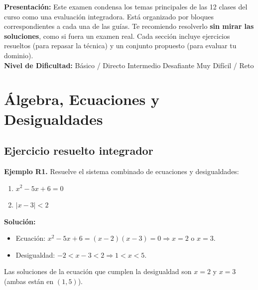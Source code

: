 \documentclass[12pt, a4paper]{article}
\begin{document}


\vspace{4pt}
\begin{cuadroinfo}
  \small
  \textbf{Presentación:} Este examen condensa los temas principales de las 12 clases del curso como una evaluación integradora. Está organizado por bloques correspondientes a cada una de las guías. Te recomiendo resolverlo \textbf{sin mirar las soluciones}, como si fuera un examen real. Cada sección incluye ejercicios resueltos (para repasar la técnica) y un conjunto propuesto (para evaluar tu dominio).
  \\[4pt]
  \textbf{Nivel de Dificultad:}\quad
  \facil{} Básico / Directo \quad
  \medio{} Intermedio \quad
  \dificil{} Desafiante \quad
  \muyDificil{} Muy Difícil / Reto
\end{cuadroinfo}

\vspace{8pt}

\section{Álgebra, Ecuaciones y Desigualdades}

\subsection{Ejercicio resuelto integrador}

\textbf{Ejemplo R1.} Resuelve el sistema combinado de ecuaciones y desigualdades:
\begin{enumerate}[label=\roman*)]
  \item $x^2 - 5x + 6 = 0$
  \item $|x - 3| < 2$
\end{enumerate}

\begin{cuadrosolucion}
  \textbf{Solución:}
  \begin{itemize}
    \item Ecuación: $x^2 - 5x + 6 = (x - 2)(x - 3) = 0 \Rightarrow x = 2$ o $x = 3$.
    \item Desigualdad: $-2 < x - 3 < 2 \Rightarrow 1 < x < 5$.
  \end{itemize}
  Las soluciones de la ecuación que cumplen la desigualdad son $x = 2$ y $x = 3$ (ambas están en $(1, 5)$).
\end{cuadrosolucion}
\end{document}
